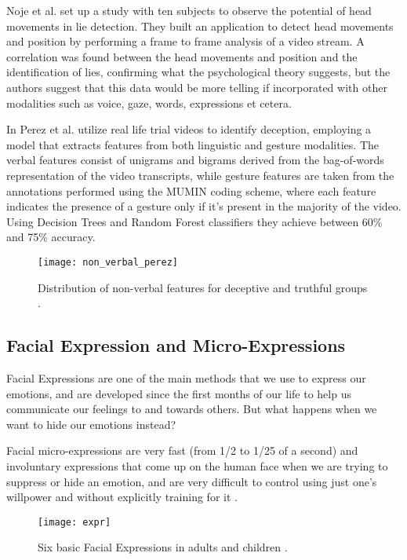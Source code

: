 Noje et al. \cite{7367432} set up a study with ten subjects to observe the potential of head movements in lie detection. They built an application to detect head movements and position by performing a frame to frame analysis of a video stream. A correlation was found between the head movements and position and the identification of lies, confirming what the psychological theory suggests, but the authors suggest that this data would be more telling if incorporated with other modalities such as voice, gaze, words, expressions et cetera.

In \cite{Perez-Rosas:2015:DDU:2818346.2820758} Perez et al. utilize real life trial videos to identify deception, employing a model that extracts features from both linguistic and gesture modalities. The verbal features consist of unigrams and bigrams derived from the bag-of-words representation of the video transcripts, while gesture features are taken from the annotations performed using the MUMIN coding scheme, where each feature indicates the presence of a gesture only if it's present in the majority of the video. Using Decision Trees and Random Forest classifiers they achieve between 60\% and 75\% accuracy.

\begin{figure}[H]
	\centering
	\texttt{[image: non\_verbal\_perez]}
	\caption{Distribution of non-verbal features for deceptive and truthful groups \cite{Perez-Rosas:2015:DDU:2818346.2820758}.}
\end{figure}

\subsection{Facial Expression and Micro-Expressions}
Facial Expressions are one of the main methods that we use to express our emotions, and are developed since the first months of our life to help us communicate our feelings to and towards others. But what happens when we want to hide our emotions instead? 

Facial micro-expressions are very fast (from 1/2 to 1/25 of a second) and involuntary expressions that come up on the human face when we are trying to suppress or hide an emotion, and are very difficult to control using just one's willpower and without explicitly training for it \cite{EkmanER}.

\begin{figure}[H]
	\centering
	\texttt{[image: expr]}
	\caption{Six basic Facial Expressions in adults and children \cite{baby_fe}.}
\end{figure}

